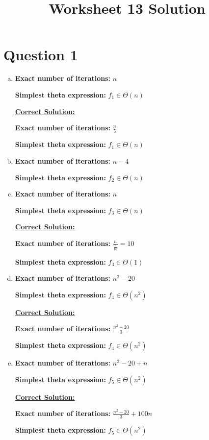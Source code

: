 \documentclass[12pt]{article}
\begin{document}
\title{Worksheet 13 Solution}
\maketitle

\section*{Question 1}
\begin{enumerate}[a.]
    \item

    \textbf{Exact number of iterations:} $n$

    \textbf{Simplest theta expression:} $f_1 \in \Theta (n)$

    \bigskip

    \underline{\textbf{Correct Solution:}}

    \textbf{Exact number of iterations:} $\frac{n}{5}$

    \textbf{Simplest theta expression:} $f_1 \in \Theta (n)$

    \item

    \textbf{Exact number of iterations:} $n-4$

    \textbf{Simplest theta expression:} $f_2 \in \Theta (n)$

    \item

    \textbf{Exact number of iterations:} $n$

    \textbf{Simplest theta expression:} $f_3 \in \Theta (n)$

    \bigskip

    \underline{\textbf{Correct Solution:}}

    \textbf{Exact number of iterations:} $\frac{n}{\frac{n}{10}} = 10$

    \textbf{Simplest theta expression:} $f_3 \in \Theta (1)$

    \item

    \textbf{Exact number of iterations:} $n^2-20$

    \textbf{Simplest theta expression:} $f_4 \in \Theta (n^2)$

    \bigskip

    \underline{\textbf{Correct Solution:}}

    \textbf{Exact number of iterations:} $\frac{n^2-20}{3}$

    \textbf{Simplest theta expression:} $f_4 \in \Theta (n^2)$

    \item

    \textbf{Exact number of iterations:} $n^2-20+n$

    \textbf{Simplest theta expression:} $f_5 \in \Theta (n^2)$

    \bigskip

    \underline{\textbf{Correct Solution:}}

    \textbf{Exact number of iterations:} $\frac{n^2-20}{3} + 100n$

    \textbf{Simplest theta expression:} $f_5 \in \Theta (n^2)$
\end{enumerate}
\end{document}
